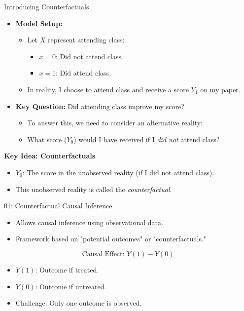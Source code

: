 \documentclass{beamer}
\begin{document}
\begin{frame}{Introducing Counterfactuals}
\begin{itemize}
    \item \textbf{Model Setup:}
    \begin{itemize}
        \item Let \(X\) represent attending class:
        \begin{itemize}
            \item \(x = 0\): Did not attend class.
            \item \(x = 1\): Did attend class.
        \end{itemize}
        \item In reality, I choose to attend class and receive a score \(Y_1\) on my paper.
    \end{itemize}
    
    \vspace{0.3cm}
    
    \item \textbf{Key Question:} Did attending class improve my score?
    \begin{itemize}
        \item To answer this, we need to consider an alternative reality:
        \item What score (\(Y_0\)) would I have received if I \textit{did not} attend class?
    \end{itemize}
\end{itemize}

\vspace{0.5cm}

\textbf{Key Idea: Counterfactuals}
\begin{itemize}
    \item \(Y_0\): The score in the unobserved reality (if I did not attend class).
    \item This unobserved reality is called the \textit{counterfactual}.
\end{itemize}
\end{frame}


\begin{frame}{01: Counterfactual Causal Inference}
\begin{itemize}
    \item Allows causal inference using observational data.
    \item Framework based on "potential outcomes" or "counterfactuals."
\end{itemize}

\[
\text{Causal Effect: } Y(1) - Y(0)
\]
\begin{itemize}
    \item \( Y(1) \): Outcome if treated.
    \item \( Y(0) \): Outcome if untreated.
    \item Challenge: Only one outcome is observed.
\end{itemize}
\end{frame}
\end{document}
